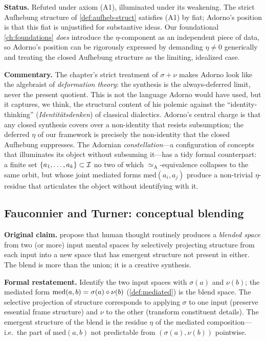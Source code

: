 \textbf{Status.} Refuted under axiom (A1), illuminated under its
weakening. The strict Aufhebung structure of
\cref{def:aufheb-struct} satisfies (A1) by fiat; Adorno's position
is that this fiat is unjustified for substantive ideas. Our
foundational \cref{ch:foundations} \emph{does} introduce the
$\eta$-component as an independent piece of data, so Adorno's
position can be rigorously expressed by demanding $\eta\neq 0$
generically and treating the closed Aufhebung structure as the
limiting, idealized case.

\textbf{Commentary.} The chapter's strict treatment of $\sigma+\nu$
makes Adorno look like the algebraist of \emph{deformation theory}:
the synthesis is the always-deferred limit, never the present
quotient.  This is not the language Adorno would have used, but it
captures, we think, the structural content of his polemic against
the ``identity-thinking'' (\emph{Identit\"atsdenken}) of
classical dialectics. Adorno's central charge is that any closed
synthesis covers over a non-identity that resists subsumption; the
deferred $\eta$ of our framework is precisely the
non-identity that the closed Aufhebung suppresses. The Adornian
\emph{constellation}---a configuration of concepts that illuminates
its object without subsuming it---has a tidy formal counterpart: a
finite set $\{a_1,\ldots,a_k\}\subset\mathcal{I}$ no two of which
$\simeq_{\text{A}}$-equivalence collapses to the same orbit, but
whose joint mediated forms $\mathrm{med}(a_i,a_j)$ produce a non-trivial
$\eta$-residue that articulates the object without identifying with
it.

\subsection*{Fauconnier and Turner: conceptual blending}

\textbf{Original claim.} \citet{FauconnierTurner2002} propose that
human thought routinely produces a \emph{blended space} from two (or
more) input mental spaces by selectively projecting structure from
each input into a new space that has emergent structure not present
in either. The blend is more than the union; it is a creative
synthesis.

\textbf{Formal restatement.} Identify the two input spaces with
$\sigma(a)$ and $\nu(b)$; the mediated form
$\mathrm{med}(a,b)=\sigma(a)\mathbin{\diamond}\nu(b)$ (\cref{def:mediated}) is the
blend space. The selective projection of structure corresponds to
applying $\sigma$ to one input (preserve essential frame structure)
and $\nu$ to the other (transform constituent details). The emergent
structure of the blend is the residue $\eta$ of the mediated
composition---i.e.\ the part of $\mathrm{med}(a,b)$ not predictable from
$(\sigma(a),\nu(b))$ pointwise.

